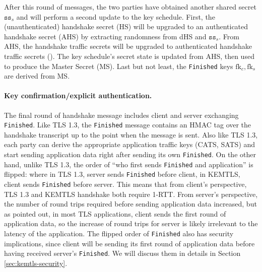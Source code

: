 \documentclass[letterpaper,12pt,titlepage,oneside,final]{book}
\begin{document}
After this round of messages, the two parties have obtained another shared secret $\texttt{ss}_s$ and will perform a second update to the key schedule.
First, the (unauthenticated) handshake secret (HS) will be upgraded to an authenticated handshake secret (AHS) by extracting randomness from dHS and $\texttt{ss}_s$.
From AHS, the handshake traffic secrets will be upgraded to authenticated handshake traffic secrets ().
The key schedule's secret state is updated from AHS, then used to produce the Master Secret (MS).
Last but not least, the \texttt{Finished} keys $\text{fk}_c, \text{fk}_s$ are derived from MS.

\paragraph{Key confirmation/explicit authentication.} The final round of handshake message includes client and server exchanging \texttt{Finished}.
Like TLS 1.3, the \texttt{Finished} message contains an HMAC tag over the handshake transcript up to the point when the message is sent.
Also like TLS 1.3, each party can derive the appropriate application traffic keys ({\color{red}CATS, SATS}) and start sending application data right after sending its own \texttt{Finished}.
On the other hand, unlike TLS 1.3, the order of ``who first sends \texttt{Finished} and application'' is flipped: where in TLS 1.3, server sends \texttt{Finished} before client, in KEMTLS, client sends \texttt{Finished} before server.
This means that from client's perspective, TLS 1.3 and KEMTLS handshake both require 1-RTT.
From server's perspective, the number of round trips required before sending application data increased, but as \cite{DBLP:conf/ccs/SchwabeSW20} pointed out, in most TLS applications, client sends the first round of application data, so the increase of round trips for server is likely irrelevant to the latency of the application.
The flipped order of \texttt{Finished} also has security implications, since client will be sending its first round of application data before having received server's \texttt{Finished}.
We will discuss them in details in Section \ref{sec:kemtls-security}.
\end{document}

